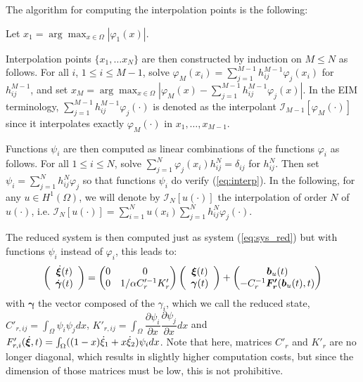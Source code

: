 The algorithm for computing the interpolation points is the following:

Let $x_1 = \arg \max_{x \in \Omega} | \varphi_1 (x)|$.

Interpolation points $\{x_1, \dots x_N \}$
are then constructed by induction on $M\leq N$ as follows.
For all $i$, $1\leq i \leq M-1$, solve $\varphi_M (x_i) = \sum_{j = 1}^{M-1} h_{ij}^{M-1}  \varphi_j (x_i)$
for $h_{ij}^{M-1}$,
and set $x_M = \arg \max_{x \in \Omega} | \varphi_M (x) - \sum_{j=1}^{M-1} h_{ij}^{M-1} \varphi_j(x) |$.
In the EIM terminology, $\sum_{j=1}^{M-1} h_{ij}^{M-1} \varphi_j(\cdot)$ is denoted as the 
interpolant $\mathcal{I}_{M-1}[ \varphi_M (\cdot) ]$ since it interpolates exactly $\varphi_M (\cdot)$
in $x_1,\dots, x_{M-1}$. 

Functions $\psi_i$ are then computed as linear combinations of the functions $\varphi_i$
as follows. For all $1\leq i \leq N$, solve
$\sum_{j=1}^N \varphi_j(x_i) h_{ij}^N = \delta_{ij}$ for $h_{ij}^N$.
Then set $\psi_i = \sum_{j = 1}^ N h_{ij}^N \varphi_j$ so
that functions $\psi_i$ do verify (\ref{eq:interp}).
In the following, for any $u \in H^1 ( \Omega)$, we will denote by $\mathcal{I}_N [u(\cdot)]$ the 
interpolation of order $N$ of $u(\cdot)$, i.e. $\mathcal{I}_N [u(\cdot)] = \sum_{i=1}^N u(x_i) \sum_{j = 1}^ N h_{ij}^N \varphi_j(\cdot)$.

The reduced system is then computed just as system (\ref{eq:sys_red}) but with functions
$\psi_i$ instead of $\varphi_i$, this leads to:
\begin{equation}
  \left( \begin{array}{c}
  \dot{\bm{\xi}}(t) \\ \dot{\bm{\gamma}}(t)
 \end{array} \right) = \left( \begin{matrix} 0 & 0 \\ 0 & 1/\alpha C_r'^{-1} K_r' \end{matrix} \right)\left( \begin{array}{c}
   \bm{\xi}(t) \\ \bm{\gamma}(t)
 \end{array} \right) + \begin{pmatrix}
                        \bm{b}_u(t) \\ -C_r^{-1} \bm{F_r'}(\bm{b}_u(t),t)
                       \end{pmatrix}
\label{eq:red2}                       
\end{equation}
with $\bm{\gamma}$ the vector composed of the $\gamma_i$, which we call 
the reduced state, $C'_{r,ij} = \int_\Omega  \psi_i \psi_j dx$, $K'_{r,ij} = \int_\Omega  \dfrac{ \partial \psi_i}{\partial x} \dfrac{ \partial \psi_j}{\partial x} dx$
and ${F'_{r,i}}(\dot{\bm{\xi}},t) = \int_\Omega ((1-x) \dot \xi_1 + x \dot \xi_2) \psi_i dx$.
Note that here, matrices $C'_{r}$ and $K'_{r}$ are no longer diagonal, which results 
in slightly higher computation costs, but since the dimension of those matrices
must be low, this is not prohibitive. 

